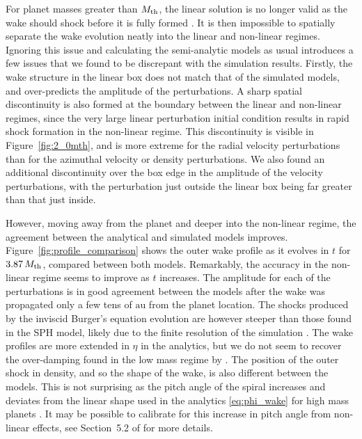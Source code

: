 For planet masses greater than $M_{\rm th}$, the linear solution is no longer valid as the wake should shock before it is fully formed \citep{goodman2001}.
It is then impossible to spatially separate the wake evolution neatly into the linear and non-linear regimes.
Ignoring this issue and calculating the semi-analytic models as usual introduces a few issues that we found to be discrepant with the simulation results.
Firstly, the wake structure in the linear box does not match that of the simulated models, and over-predicts the amplitude of the perturbations.
A sharp spatial discontinuity is also formed at the boundary between the linear and non-linear regimes, since the very large linear perturbation initial condition results in rapid shock formation in the non-linear regime.
This discontinuity is visible in Figure~\ref{fig:2_0mth}, and is more extreme for the radial velocity perturbations than for the azimuthal velocity or density perturbations.
We also found an additional discontinuity over the box edge in the amplitude of the velocity perturbations, with the perturbation just outside the linear box being far greater than that just inside.

However, moving away from the planet and deeper into the non-linear regime, the agreement between the analytical and simulated models improves.
Figure~\ref{fig:profile_comparison} shows the outer wake profile as it evolves in $t$ for $3.87 \, M_{\rm th}$, compared between both models.
Remarkably, the accuracy in the non-linear regime seems to improve as $t$ increases.
The amplitude for each of the perturbations is in good agreement between the models after the wake was propagated only a few tens of $\mathrm{au}$ from the planet location.
The shocks produced by the inviscid Burger's equation evolution are however steeper than those found in the SPH model, likely due to the finite resolution of the simulation \citep{lodato2010}.
The wake profiles are more extended in $\eta$ in the analytics, but we do not seem to recover the over-damping found in the low mass regime by \citet{cimerman2021}.
The position of the outer shock in density, and so the shape of the wake, is also different between the models.
This is not surprising as the pitch angle of the spiral increases and deviates from the linear shape used in the analytics \eqref{eq:phi_wake} for high mass planets \cite{zhu2015}.
It may be possible to calibrate for this increase in pitch angle from non-linear effects, see Section~5.2 of \citet{cimerman2021} for more details.

